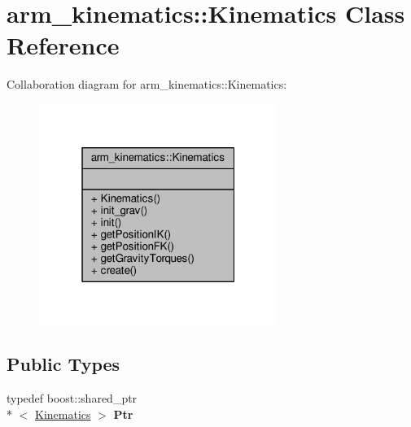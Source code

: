 \hypertarget{classarm__kinematics_1_1_kinematics}{\section{arm\-\_\-kinematics\-:\-:Kinematics Class Reference}
\label{classarm__kinematics_1_1_kinematics}
}


Collaboration diagram for arm\-\_\-kinematics\-:\-:Kinematics\-:
\nopagebreak
\begin{figure}[H]
\begin{center}
\leavevmode
\includegraphics[width=220pt]{classarm__kinematics_1_1_kinematics__coll__graph}
\end{center}
\end{figure}
\subsection*{Public Types}
\begin{DoxyCompactItemize}
\item 
\hypertarget{classarm__kinematics_1_1_kinematics_acccc63bf9ad564b432798a92b7f4f1bd}{typedef boost\-::shared\-\_\-ptr\\*
$<$ \hyperlink{classarm__kinematics_1_1_kinematics}{Kinematics} $>$ {\bfseries Ptr}}\label{classarm__kinematics_1_1_kinematics_acccc63bf9ad564b432798a92b7f4f1bd}

\end{DoxyCompactItemize}
